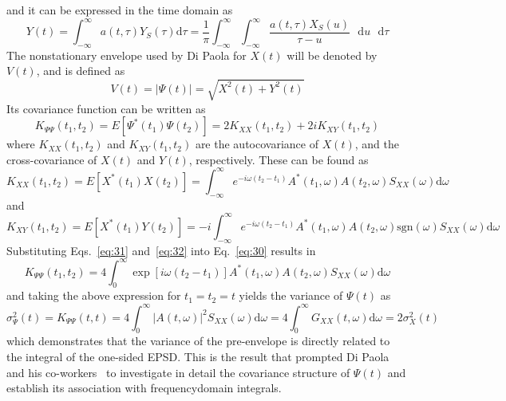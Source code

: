\documentclass{article}
\begin{document}
and it can be expressed in the time domain as
\begin{equation}
  Y (t) = \int_{- \infty}^{\infty} a (t, \tau) Y_S (\tau) \mathrm{d} \tau =
  \frac{1}{\pi}  \int_{- \infty}^{\infty} \int_{- \infty}^{\infty} \frac{a (t,
  \tau) X_S (u)}{\tau - u} \textrm{~ d} u \textrm{~ d} \tau \label{eq:28}
\end{equation}
The nonstationary envelope used by Di Paola for $X (t)$ will be denoted by $V
(t)$, and is defined as
\begin{equation}
  V (t) = | \Psi (t) | = \sqrt{X^2 (t) + Y^2 (t)} \label{eq:29}
\end{equation}
Its covariance function can be written as
\begin{equation}
  K_{\Psi \Psi} (t_1, t_2) = E [\Psi^{\ast} (t_1) \Psi (t_2)] = 2 K_{XX} (t_1,
  t_2) + 2 iK_{XY} (t_1, t_2) \label{eq:30}
\end{equation}
where $K_{XX} (t_1, t_2)$ and $K_{XY} (t_1, t_2)$ are the autocovariance of $X
(t)$, and the cross-covariance of $X (t)$ and $Y (t)$, respectively. These can
be found as
\begin{equation}
  K_{XX} (t_1, t_2) = E [X^{\ast} (t_1) X (t_2)] = \int_{- \infty}^{\infty}
  e^{- i \omega (t_2 - t_1)} A^{\ast} (t_1, \omega) A (t_2, \omega) S_{XX}
  (\omega) \mathrm{d} \omega \label{eq:31}
\end{equation}
and
\begin{equation}
  K_{XY} (t_1, t_2) = E [X^{\ast} (t_1) Y (t_2)] = - i \int_{-
  \infty}^{\infty} e^{- i \omega (t_2 - t_1)} A^{\ast} (t_1, \omega) A (t_2,
  \omega) \mathrm{sgn} (\omega) S_{XX} (\omega) \mathrm{d} \omega
  \label{eq:32}
\end{equation}
Substituting Eqs.~\eqref{eq:31} and~\eqref{eq:32} into Eq.~\eqref{eq:30}
results in
\begin{equation}
  K_{\Psi \Psi} (t_1, t_2) = 4 \int_0^{\infty} \exp [i \omega (t_2 - t_1)]
  A^{\ast} (t_1, \omega) A (t_2, \omega) S_{XX} (\omega) \mathrm{d} \omega
  \label{eq:33}
\end{equation}
and taking the above expression for $t_1 = t_2 = t$ yields the variance of
$\Psi (t)$ as
\begin{equation}
  \sigma_{\Psi}^2 (t) = K_{\Psi \Psi} (t, t) = 4 \int_0^{\infty} |A (t,
  \omega) |^2 S_{XX} (\omega) \mathrm{d} \omega = 4 \int_0^{\infty} G_{XX} (t,
  \omega) \mathrm{d} \omega = 2 \sigma_X^2 (t) \label{eq:34}
\end{equation}
which demonstrates that the variance of the pre-envelope is directly related
to the integral of the one-sided EPSD. This is the result that prompted Di
Paola and his
co-workers~{\cite{DiPaolaPetrucci1990,Muscolino1988,LutesSarkani1997}} to
investigate in detail the covariance structure of $\Psi (t)$ and establish its
association with frequencydomain integrals.
\end{document}
